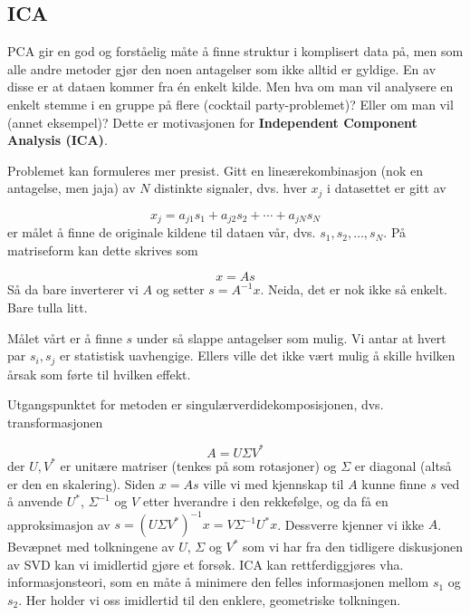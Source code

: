 \subsection{ICA}
PCA gir en god og forståelig måte å finne struktur i komplisert data på, men som alle andre metoder gjør den noen antagelser som ikke alltid er gyldige. En av disse er at dataen kommer fra én enkelt kilde. Men hva om man vil analysere en enkelt stemme i en gruppe på flere (cocktail party-problemet)? Eller om man vil (annet eksempel)? Dette er motivasjonen for \textbf{Independent Component Analysis (ICA)}.

Problemet kan formuleres mer presist. Gitt en lineærekombinasjon (nok en antagelse, men jaja) av $N$ distinkte signaler, dvs. hver $x_j$ i datasettet er gitt av

\begin{equation}
	x_j = a_{j1} s_1 + a_{j2} s_2 + \cdots + a_{jN} s_N
\end{equation}
er målet å finne de originale kildene til dataen vår, dvs. $s_1, s_2, \dots, s_N$. På matriseform kan dette skrives som

\begin{equation}
	x = A s
\end{equation}
Så da bare inverterer vi $A$ og setter $s = A^{-1} x$. Neida, det er nok ikke så enkelt. Bare tulla litt.

Målet vårt er å finne $s$ under så slappe antagelser som mulig. Vi antar at hvert par $s_i, s_j$ er statistisk uavhengige. Ellers ville det ikke vært mulig å skille hvilken årsak som førte til hvilken effekt.

Utgangspunktet for metoden er singulærverdidekomposisjonen, dvs. transformasjonen

\begin{equation}
	A = U \Sigma V^*
\end{equation}
der $U, V^*$ er unitære matriser (tenkes på som rotasjoner) og $\Sigma$ er diagonal (altså er den en skalering). Siden $x = A s$ ville vi med kjennskap til $A$ kunne finne $s$ ved å anvende $U^*$, $\Sigma^{-1}$ og $V$ etter hverandre i den rekkefølge, og da få en approksimasjon av $s = (U \Sigma V^*)^{-1} x = V \Sigma^{-1} U^* x$. Dessverre kjenner vi ikke $A$. Bevæpnet med tolkningene av $U$, $\Sigma$ og $V^*$ som vi har fra den tidligere diskusjonen av SVD kan vi imidlertid gjøre et forsøk. ICA kan rettferdiggjøres vha. informasjonsteori, som en måte å minimere den felles informasjonen mellom $s_1$ og $s_2$. Her holder vi oss imidlertid til den enklere, geometriske tolkningen.


